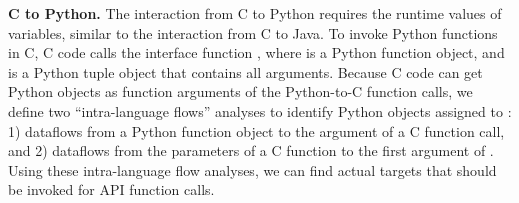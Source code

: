 \medskip

\textbf{C to Python.} The interaction from C to Python requires the runtime
values of variables, similar to the interaction from C to Java.  To invoke
Python functions in C, C code calls the interface function
, where  is a Python
function object, and  is a Python tuple object that contains all
arguments.  Because C code can get Python objects as function arguments of the
Python-to-C function calls, we define two ``intra-language flows'' analyses to
identify Python objects assigned to : 1) dataflows from a Python
function object to the argument of a C function call, and 2) dataflows from the
parameters of a C function to the first argument of
.  Using these intra-language flow analyses, we can
find actual targets that should be invoked for  API
function calls.

